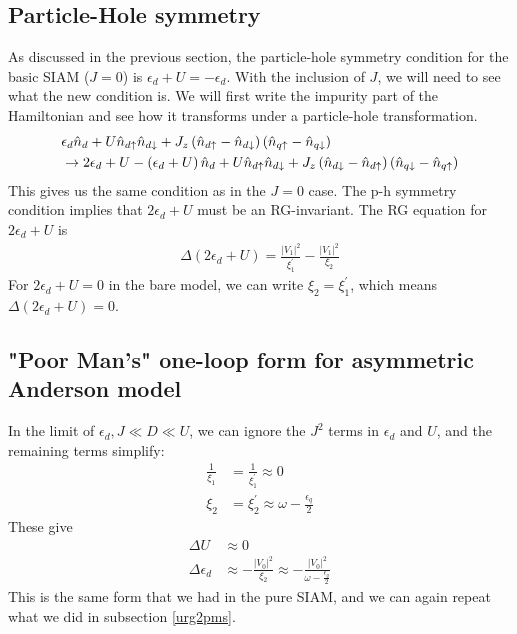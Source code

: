 \documentclass[12pt,twoside]{report}
\numberwithin{equation}{section}
\begin{document}
\subsection{Particle-Hole symmetry}
As discussed in the previous section, the particle-hole symmetry condition for the basic SIAM (\(J=0\)) is \(\epsilon_d + U = -\epsilon_d\). With the inclusion of \(J\), we will need to see what the new condition is. We will first write the impurity part of the Hamiltonian and see how it transforms under a particle-hole transformation.
\begin{equation}\begin{aligned}
	&\epsilon_d \hat n_d + U \hat n_{d\uparrow}\hat n_{d\downarrow} + J_z \left(\hat n_{d\uparrow} - \hat n_{d\downarrow}\right)\left(\hat n_{q\uparrow} - \hat n_{q\downarrow}\right)\\
&	\rightarrow 2\epsilon_d + U  -\left(\epsilon_d + U\right)\hat n_d + U \hat n_{d\uparrow}\hat n_{d\downarrow} + J_z \left(\hat n_{d\downarrow} - \hat n_{d\uparrow}\right)\left(\hat n_{q\downarrow} - \hat n_{q\uparrow}\right)\\
\end{aligned}\end{equation}
This gives us the same condition as in the \(J=0\) case. The p-h symmetry condition implies that \(2\epsilon_d + U\) must be an RG-invariant. The RG equation for \(2\epsilon_d + U\) is
\begin{equation}\begin{aligned}
	\Delta \left(2\epsilon_d + U\right) = \frac{|V_1|^2}{\xi_1^\prime} - \frac{|V_1|^2}{\xi_2}
\end{aligned}\end{equation}
For \(2\epsilon_d + U=0\) in the bare model, we can write \(\xi_2 = \xi_1^\prime\), which means \(\Delta \left(2\epsilon_d + U\right) = 0\).
\subsection{"Poor Man's" one-loop form for asymmetric Anderson model}
In the limit of \(\epsilon_d, J \ll D \ll U \), we can ignore the \(J^2\) terms in \(\epsilon_d\) and \(U\), and the remaining terms simplify:
\begin{equation}\begin{aligned}
	\frac{1}{\xi_1} &= \frac{1}{\xi_1^\prime} \approx 0\\
	\xi_2 &= \xi_2^\prime \approx \omega - \frac{\epsilon_q}{2}
\end{aligned}\end{equation}
These give
\begin{equation}\begin{aligned}
	\Delta U &\approx 0 \\
	\Delta \epsilon_d &\approx - \frac{|V_0|^2}{\xi_2} \approx -\frac{|V_0|^2}{\omega - \frac{\epsilon_q}{2}}
\end{aligned}\end{equation}
This is the same form that we had in the pure SIAM, and we can again repeat what we did in subsection \ref{urg2pms}.
\end{document}
